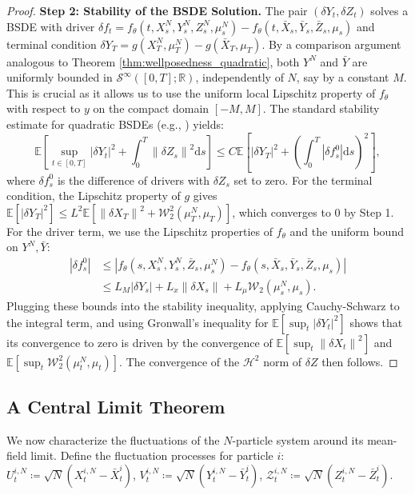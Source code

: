 \documentclass[qian]{imsart}
\newcommand{\R}{\mathbb{R}}
\newcommand{\E}{\mathbb{E}}
\newcommand{\dd}{\mathrm{d}}
\newcommand{\norm}[1]{\left\lVert#1\right\rVert}
\newcommand{\abs}[1]{\left\lvert#1\right\rvert}
\newcommand{\wass}{\mathcal{W}_2}
\theoremstyle{plain}
\theoremstyle{definition}
\begin{document}
\begin{proof}
\textbf{Step 2: Stability of the BSDE Solution.}
The pair $(\delta Y_t, \delta Z_t)$ solves a BSDE with driver $\delta f_t = f_\theta(t, X^N_s, Y^N_s, Z^N_s, \mu^N_s) - f_\theta(t, \bar{X}_s, \bar{Y}_s, \bar{Z}_s, \mu_s)$ and terminal condition $\delta Y_T = g(X^N_T, \mu^N_T) - g(\bar{X}_T, \mu_T)$.
By a comparison argument analogous to Theorem \ref{thm:wellposedness_quadratic}, both $Y^N$ and $\bar{Y}$ are uniformly bounded in $\mathcal{S}^\infty([0,T];\R)$, independently of $N$, say by a constant $M$. This is crucial as it allows us to use the uniform local Lipschitz property of $f_\theta$ with respect to $y$ on the compact domain $[-M, M]$. The standard stability estimate for quadratic BSDEs (e.g., \cite{ElKarouiPengQuenez1997}) yields:
\[ \E\left[\sup_{t \in [0,T]} \abs{\delta Y_t}^2 + \int_0^T \norm{\delta Z_s}^2 \dd s\right] \le C \E\left[ \abs{\delta Y_T}^2 + \left(\int_0^T \abs{\delta f_s^0} \dd s\right)^2 \right], \]
where $\delta f^0_s$ is the difference of drivers with $\delta Z_s$ set to zero. For the terminal condition, the Lipschitz property of $g$ gives $\E[\abs{\delta Y_T}^2] \le L^2 \E[\norm{\delta X_T}^2 + \wass^2(\mu^N_T, \mu_T)]$, which converges to 0 by Step 1. For the driver term, we use the Lipschitz properties of $f_\theta$ and the uniform bound on $Y^N, \bar{Y}$:
\begin{align*}
\abs{\delta f_s^0} &\le \abs{f_\theta(s, X^N_s, Y^N_s, \bar{Z}_s, \mu^N_s) - f_\theta(s, \bar{X}_s, \bar{Y}_s, \bar{Z}_s, \mu_s)} \\
&\le L_M\abs{\delta Y_s} + L_x\norm{\delta X_s} + L_\mu\wass(\mu^N_s, \mu_s).
\end{align*}
Plugging these bounds into the stability inequality, applying Cauchy-Schwarz to the integral term, and using Gronwall's inequality for $\E[\sup_t |\delta Y_t|^2]$ shows that its convergence to zero is driven by the convergence of $\E[\sup_t \norm{\delta X_t}^2]$ and $\E[\sup_t \wass^2(\mu^N_t, \mu_t)]$. The convergence of the $\mathcal{H}^2$ norm of $\delta Z$ then follows.
\end{proof}

\subsection{A Central Limit Theorem}
We now characterize the fluctuations of the $N$-particle system around its mean-field limit. Define the fluctuation processes for particle $i$:
$U^{i,N}_t \coloneqq \sqrt{N}(X^{i,N}_t - \bar{X}^i_t)$,
$V^{i,N}_t \coloneqq \sqrt{N}(Y^{i,N}_t - \bar{Y}^i_t)$,
$\mathcal{Z}^{i,N}_t \coloneqq \sqrt{N}(Z^{i,N}_t - \bar{Z}^i_t)$.
\end{document}
